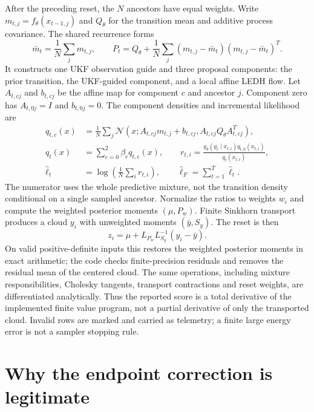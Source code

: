 After the preceding reset, the $N$ ancestors have equal weights.  Write
$m_{t,j}=f_\theta(x_{t-1,j})$ and $Q_\theta$ for the transition mean and
additive process covariance.  The shared recurrence forms
\begin{equation}
 \bar m_t=\frac1N\sum_jm_{t,j},\qquad
 P_t=Q_\theta+\frac1N\sum_j(m_{t,j}-\bar m_t)(m_{t,j}-\bar m_t)^T.
 \label{eq:bf-surrogate-predictive-mixture}
\end{equation}
It constructs one UKF observation guide and three proposal components: the
prior transition, the UKF-guided component, and a local affine LEDH flow.
Let $A_{t,cj}$ and $b_{t,cj}$ be the affine map for component $c$ and ancestor
$j$.  Component zero has $A_{t,0j}=I$ and $b_{t,0j}=0$.  The component densities
and incremental likelihood are
\begin{align}
 q_{t,c}(x)&=\frac1N\sum_j\mathcal N\!\left(x;A_{t,cj}m_{t,j}+b_{t,cj},
                         A_{t,cj}Q_\theta A_{t,cj}^T\right),\\
 q_t(x)&=\sum_{c=0}^2\beta_c q_{t,c}(x),\qquad
 r_{t,i}=\frac{g_\theta(y_t\mid x_{t,i})q_{t,0}(x_{t,i})}{q_t(x_{t,i})},\\
 \widehat\ell_t&=\log\left(\frac1N\sum_i r_{t,i}\right),\qquad
 \widehat\ell_F=\sum_{t=1}^T\widehat\ell_t.
 \label{eq:bf-surrogate-mixture-correction}
\end{align}
The numerator uses the whole predictive mixture, not the transition density
conditional on a single sampled ancestor.  Normalize the ratios to weights
$w_i$ and compute the weighted posterior moments $(\mu,P_w)$.  Finite Sinkhorn
transport produces a cloud $y_i$ with unweighted moments $(\bar y,S_y)$.
The reset is then
\begin{equation}
 z_i=\mu+L_{P_w}L_{S_y}^{-1}(y_i-\bar y).
 \label{eq:bf-surrogate-reset}
\end{equation}
On valid positive-definite inputs this restores the weighted posterior moments
in exact arithmetic; the code checks finite-precision residuals and removes the
residual mean of the centered cloud.  The same operations, including mixture
responsibilities, Cholesky tangents, transport contractions and reset weights,
are differentiated analytically.
Thus the reported score is a total derivative of the implemented finite value
program, not a partial derivative of only the transported cloud.  Invalid
rows are marked and carried as telemetry; a finite large energy error is not a
sampler stopping rule.

\section{Why the endpoint correction is legitimate}
\label{sec:bf-surrogate-mh-proof}

